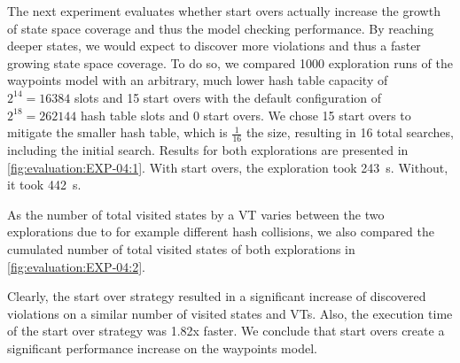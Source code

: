 \documentclass[
fancyheadings, %
%
%
]{stsreprt}
\begin{document}
The next experiment evaluates whether start overs actually increase the growth of state space coverage and thus the model checking performance.
By reaching deeper states, we would expect to discover more violations and thus a faster growing state space coverage.
To do so, we compared \num{1000} exploration runs of the waypoints model with an arbitrary, much lower hash table capacity of $2^{14}=\num{16384}$ slots and 15 start overs with the default configuration of $2^{18}=\num{262144}$ hash table slots and 0 start overs.
We chose 15 start overs to mitigate the smaller hash table, which is $\frac{1}{16}$ the size, resulting in 16 total searches, including the initial search.
Results for both explorations are presented in \cref{fig:evaluation:EXP-04:1}.
With start overs, the exploration took \SI{243}{\second}.
Without, it took \SI{442}{\second}.

As the number of total visited states by a VT varies between the two explorations due to for example different hash collisions, we also compared the cumulated number of total visited states of both explorations in \cref{fig:evaluation:EXP-04:2}.

Clearly, the start over strategy resulted in a significant increase of discovered violations on a similar number of visited states and VTs.
Also, the execution time of the start over strategy was 1.82x faster.
We conclude that start overs create a significant performance increase on the waypoints model.
\end{document}
